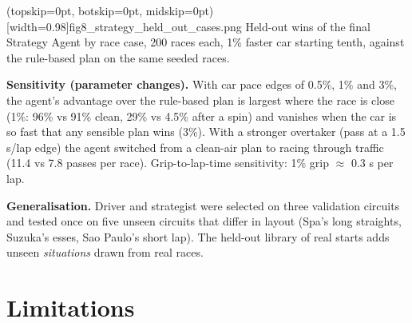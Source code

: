 \documentclass{ieeeaccess}
\begin{document}
\Figure[t!](topskip=0pt, botskip=0pt, midskip=0pt)[width=0.98\columnwidth]{fig8_strategy_held_out_cases.png}
{Held-out wins of the final Strategy Agent by race case, 200 races each, 1\% faster car starting tenth, against the rule-based plan on the same seeded races.\label{fig:fig8_strategy_held_out_cases}}

\textbf{Sensitivity (parameter changes).} With car pace edges of 0.5\%, 1\% and 3\%, the
agent's advantage over the rule-based plan is largest where the race is close (1\%:
96\% vs 91\% clean, 29\% vs 4.5\% after a spin) and vanishes when the car is so fast
that any sensible plan wins (3\%). With a stronger overtaker (pass at a 1.5 s/lap
edge) the agent switched from a clean-air plan to racing through traffic (11.4 vs
7.8 passes per race). Grip-to-lap-time sensitivity: 1\% grip \ensuremath{\approx} 0.3 s per lap.

\textbf{Generalisation.} Driver and strategist were selected on three validation
circuits and tested once on five unseen circuits that differ in layout (Spa's long
straights, Suzuka's esses, Sao Paulo's short lap). The held-out library of real
starts adds unseen \emph{situations} drawn from real races.

\section{Limitations}
\end{document}
